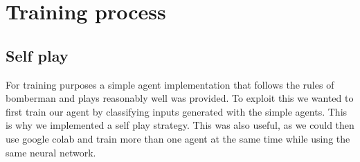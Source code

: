 \documentclass[12pt]{article}
\begin{document}
\section{Training process}

\subsection{Self play}
For training purposes a simple agent implementation that follows the rules of bomberman and plays reasonably well was provided.
To exploit this we wanted to first train our agent by classifying inputs generated with the simple agents. %
This is why we implemented a self play strategy. This was also useful, as we could then use google colab and train more than one agent at the same time while using the same neural network.



\printbibliography
\end{document}
